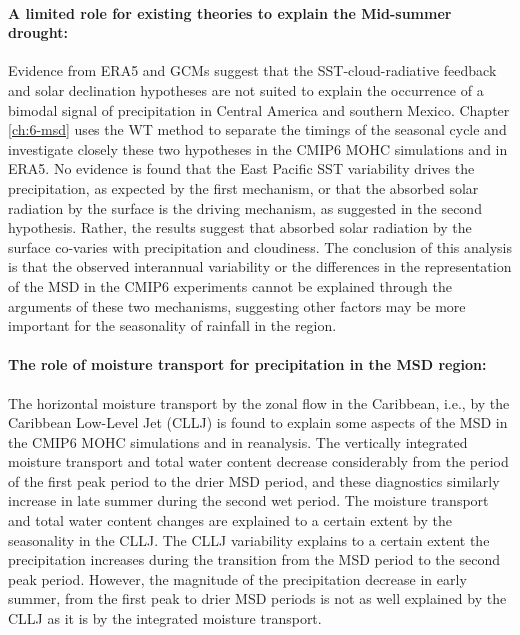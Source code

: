 \paragraph{A limited role for existing theories to explain the Mid-summer drought:}
Evidence from ERA5 and GCMs suggest that the SST-cloud-radiative feedback and solar declination hypotheses are not suited to explain the occurrence of a bimodal signal of precipitation in Central America and  southern Mexico.
Chapter \ref{ch:6-msd} uses the WT method to separate the timings of the seasonal cycle and investigate closely these two hypotheses in the CMIP6 MOHC simulations and in ERA5.
No evidence is found that the East Pacific SST variability drives the precipitation, as expected by the first mechanism, or that the absorbed solar radiation by the surface is the driving mechanism, as suggested in the second hypothesis.
 Rather, the results suggest that absorbed solar radiation by the surface co-varies with precipitation and cloudiness.
The conclusion of this analysis is that the observed interannual variability or the differences in the representation of the MSD in the CMIP6 experiments cannot be explained through the arguments of these two mechanisms, suggesting other factors may be more important for the seasonality of rainfall in the region. 



\paragraph{The role of moisture transport for precipitation in the MSD region:}
The horizontal moisture transport by the zonal flow in the Caribbean, i.e., by the Caribbean Low-Level Jet (CLLJ) is found to explain some aspects of the MSD in the CMIP6 MOHC simulations and in reanalysis. 
The vertically integrated moisture transport and total water content decrease considerably from the period of the first peak period to the drier MSD period, and these diagnostics similarly increase in late summer during the second wet period.
The moisture transport and total water content changes are explained to a certain extent by the seasonality in the CLLJ. 
The CLLJ variability explains to a certain extent the precipitation increases during the transition from the MSD period to the second peak period. 
However, the magnitude of the precipitation decrease in early summer, from the first peak to drier MSD periods is not as well explained by the CLLJ as it is by the integrated moisture transport. 



